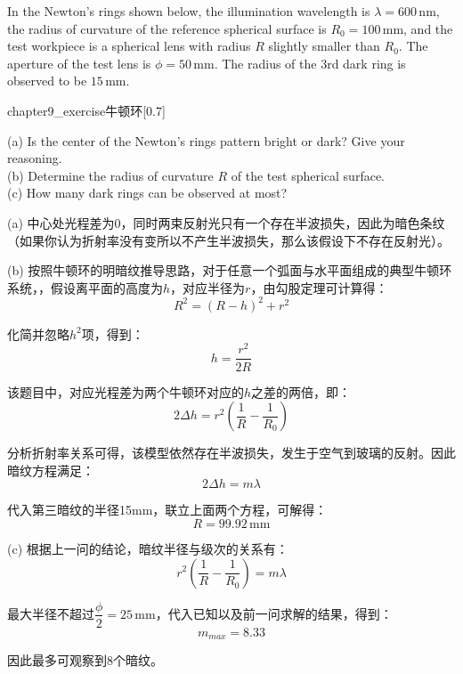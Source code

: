 \begin{solution}[Interference]
    In the Newton's rings shown below, the illumination wavelength is $\lambda = 600\,\text{nm}$, the radius of curvature of the reference spherical surface is $R_0 = 100\,\text{mm}$, and the test workpiece is a spherical lens with radius $R$ slightly smaller than $R_0$. The aperture of the test lens is $\phi = 50\,\text{mm}$. The radius of the 3rd dark ring is observed to be $15\,\text{mm}$.
    \begin{singlefigure}{chapter9_exercise牛顿环}[0.7]
    \end{singlefigure}

    (a) Is the center of the Newton's rings pattern bright or dark? Give your reasoning.\\
    (b) Determine the radius of curvature $R$ of the test spherical surface.\\
    (c) How many dark rings can be observed at most?
    \tcbrule

    (a) 中心处光程差为0，同时两束反射光只有一个存在半波损失，因此为暗色条纹（如果你认为折射率没有变所以不产生半波损失，那么该假设下不存在反射光）。

    (b) 按照牛顿环的明暗纹推导思路，对于任意一个弧面与水平面组成的典型牛顿环系统，，假设离平面的高度为$h$，对应半径为$r$，由勾股定理可计算得：
    \[R^2 = (R - h)^2 + r^2\]

    化简并忽略$h^2$项，得到：
    \[h = \dfrac{r^2}{2R}\]

    该题目中，对应光程差为两个牛顿环对应的$h$之差的两倍，即：
    \[2\Delta h = r^2 (\dfrac{1}{R} - \dfrac{1}{R_0})\]

    分析折射率关系可得，该模型依然存在半波损失，发生于空气到玻璃的反射。因此暗纹方程满足：
    \[2\Delta h = m\lambda\]

    代入第三暗纹的半径15mm，联立上面两个方程，可解得：
    \[R = 99.92\,\text{mm}\]

    (c) 根据上一问的结论，暗纹半径与级次的关系有：
    \[r^2 (\dfrac{1}{R} - \dfrac{1}{R_0}) = m\lambda\]

    最大半径不超过$\dfrac{\phi}{2} = 25\,\text{mm}$，代入已知以及前一问求解的结果，得到：
    \[m_{max} = 8.33\]

    因此最多可观察到8个暗纹。
\end{solution}

